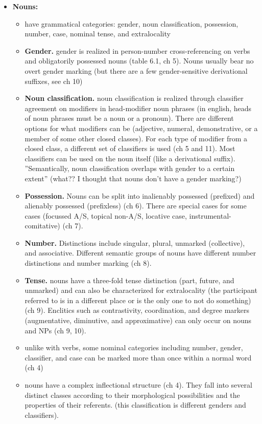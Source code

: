 \documentclass{article}
\begin{document}
\begin{itemize}
\begin{itemize}
		\item \textbf{Nouns:}
		\begin{itemize}
			\item have grammatical categories: gender, noun classification, possession, number, case, nominal tense, and extralocality
			\item \textbf{Gender.} gender is realized in person-number cross-referencing on verbs and obligatorily possessed nouns (table 6.1, ch 5). Nouns usually bear no overt gender marking (but there are a few gender-sensitive derivational suffixes, see ch 10)
			\item \textbf{Noun classification.} noun classification is realized through classifier agreement on modifiers in head-modifier noun phrases (in english, heads of noun phrases must be a noun or a pronoun). There are different options for what modifiers can be (adjective, numeral, demonstrative, or a member of some other closed classes). For each type of modifier from a closed class, a different set of classifiers is used (ch 5 and 11). Most classifiers can be used on the noun itself (like a derivational suffix). ''Semantically, noun classification overlaps with gender to a certain extent'' (what?? I thought that nouns don't have a gender marking?)
			\item \textbf{Possession.} Nouns can be split into inalienably possessed (prefixed) and alienably possessed (prefixless) (ch 6). There are special cases for some cases (focussed A/S, topical non-A/S, locative case, instrumental-comitative) (ch 7).
			\item \textbf{Number.} Distinctions include singular, plural, unmarked (collective), and associative. Different semantic groups of nouns have different number distinctions and number marking (ch 8).
			\item \textbf{Tense.} nouns have a three-fold tense distinction (part, future, and unmarked) and can also be characterized for extralocality (the participant referred to is in a different place or is the only one to not do something) (ch 9). Enclitics such as contrastivity, coordination, and degree markers (augmentative, diminutive, and approximative) can only occur on nouns and NPs (ch 9, 10).
			\item unlike with verbs, some nominal categories including number, gender, classifier, and case can be marked more than once within a normal word (ch 4)
			\item nouns have a complex inflectional structure (ch 4). They fall into several distinct classes according to their morphological possibilities and the properties of their referents. (this classification is different genders and classifiers).

\end{itemize}
\end{itemize}
\end{itemize}
\end{document}
